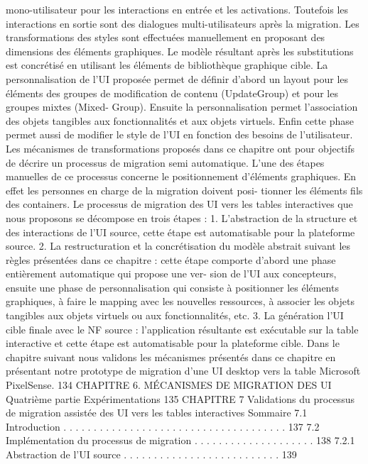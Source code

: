 \documentclass{article}
\begin{document}
mono-utilisateur pour les interactions en entrée et les activations. Toutefois les interactions en sortie
sont des dialogues multi-utilisateurs après la migration. Les transformations des styles sont effectuées
manuellement en proposant des dimensions des éléments graphiques.
Le modèle résultant après les substitutions est concrétisé en utilisant les éléments de bibliothèque
graphique cible. La personnalisation de l’UI proposée permet de déﬁnir d’abord un layout pour les
éléments des groupes de modiﬁcation de contenu (UpdateGroup) et pour les groupes mixtes (Mixed-
Group). Ensuite la personnalisation permet l’association des objets tangibles aux fonctionnalités et
aux objets virtuels. Enﬁn cette phase permet aussi de modiﬁer le style de l’UI en fonction des besoins
de l’utilisateur.
Les mécanismes de transformations proposés dans ce chapitre ont pour objectifs de décrire un
processus de migration semi automatique. L’une des étapes manuelles de ce processus concerne le
positionnement d’éléments graphiques. En effet les personnes en charge de la migration doivent posi-
tionner les éléments ﬁls des containers.
Le processus de migration des UI vers les tables interactives que nous proposons se décompose
en trois étapes :
1. L’abstraction de la structure et des interactions de l’UI source, cette étape est automatisable
pour la plateforme source.
2. La restructuration et la concrétisation du modèle abstrait suivant les règles présentées dans ce
chapitre : cette étape comporte d’abord une phase entièrement automatique qui propose une ver-
sion de l’UI aux concepteurs, ensuite une phase de personnalisation qui consiste à positionner
les éléments graphiques, à faire le mapping avec les nouvelles ressources, à associer les objets
tangibles aux objets virtuels ou aux fonctionnalités, etc.
3. La génération l’UI cible ﬁnale avec le NF source : l’application résultante est exécutable sur la
table interactive et cette étape est automatisable pour la plateforme cible.
Dans le chapitre suivant nous validons les mécanismes présentés dans ce chapitre en présentant
notre prototype de migration d’une UI desktop vers la table Microsoft PixelSense.
134
CHAPITRE 6. MÉCANISMES DE MIGRATION DES UI
Quatrième partie
Expérimentations
135
CHAPITRE 7
Validations du processus de migration
assistée des UI vers les tables interactives
Sommaire
7.1
Introduction . . . . . . . . . . . . . . . . . . . . . . . . . . . . . . . . . . . . . 137
7.2
Implémentation du processus de migration . . . . . . . . . . . . . . . . . . . . 138
7.2.1
Abstraction de l’UI source . . . . . . . . . . . . . . . . . . . . . . . . . . 139
\end{document}
